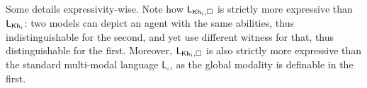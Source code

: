 \begin{textonuevo}
Some details expressivity-wise. Note how $\mathsf{L}_{{\sf Kh}_i,\square}$ is strictly more expressive than $\mathsf{L}_{{\sf Kh}_i}$: two models can depict an agent with the same abilities, thus indistinguishable for the second, and yet use different witness for that, thus distinguishable for the first. Moreover, $\mathsf{L}_{{\sf Kh}_i,\square}$ is also strictly more expressive than the standard multi-modal language $\mathsf{L}_{\square}$, as the global modality is definable in the first.
\end{textonuevo}

\medskip
